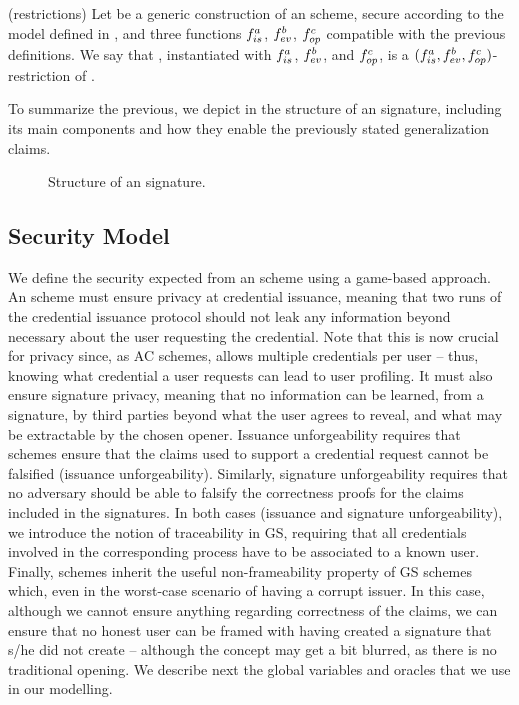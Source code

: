 \begin{definition}{(\CUASGen restrictions)}
  \label{def:uas-restrictions}
  Let \CUASGen be a generic construction of an \UAS scheme, secure according to
  the model defined in , and three functions $f_{is}^a$,
  $f_{ev}^b$, $f_{op}^c$ compatible with the previous definitions. We say that
  \CUASGen, instantiated with $f_{is}^a$, $f_{ev}^b$, and $f_{op}^c$, is a
  $(f_{is}^a,f_{ev}^b,f_{op}^c)$-restriction of \CUASGen.
\end{definition}

To summarize the previous, we depict in  the structure
of an \UAS signature, including its main components and how they enable the
previously stated generalization claims.

\begin{figure}[ht!]
  \centering
  \caption{Structure of an \UAS signature.}
  \label{fig:uas-signature}
\end{figure}

\subsection{Security Model}
\label{ssec:model-uas}

We define the security expected from an \UAS scheme using a game-based approach.
An \UAS scheme must ensure privacy at credential issuance, meaning that two
runs of the credential issuance protocol should not leak any information beyond
necessary about the user requesting the credential. Note that this is now
crucial for privacy since, as AC schemes, \UAS allows multiple credentials per
user -- thus, knowing what credential a user requests can lead to user
profiling. It must also ensure signature privacy, meaning that no information
can be learned, from a signature, by third parties beyond what the user agrees
to reveal, and what may be extractable by the chosen opener.
Issuance unforgeability requires that \UAS schemes ensure that the claims used
to support a credential request cannot be falsified (issuance unforgeability).
Similarly, signature unforgeability requires that no adversary should be able to
falsify the correctness proofs for the claims included in the signatures. In
both cases (issuance and signature unforgeability), we introduce the notion of
traceability in GS, requiring that all credentials involved in the corresponding
process have to be associated to a known user. Finally, \UAS schemes inherit the
useful non-frameability property of GS schemes which, even in the worst-case
scenario of having a corrupt issuer. In this case, although we cannot ensure
anything regarding correctness of the claims, we can ensure that no honest user
can be framed with having created a signature that s/he did not create --
although the concept may get a bit blurred, as there is no traditional opening.
%
We describe next the global variables and oracles that we use in our modelling.

